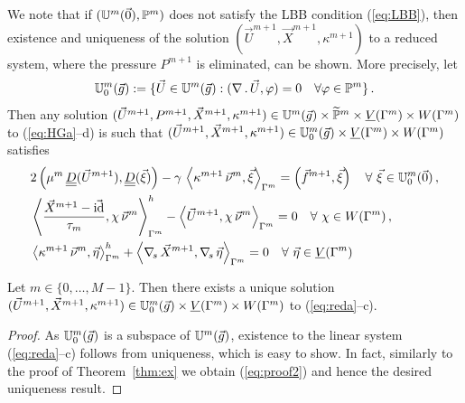 We note that if $(\uspacedisc{0}{m},\pspace^m)$ does not satisfy the LBB
condition (\ref{eq:LBB}), then existence and uniqueness of the solution
$(\vec U^{m+1},\vec X^{m+1},\kappa^{m+1})$ to a reduced system, where the
pressure $P^{m+1}$ is eliminated, can be shown. More precisely, let
\begin{equation}
\uspacesimple^m_0(\vec g) :=
\{ \vec U \in \uspacedisc{g}{m} : (\nabla\,.\,\vec U, \varphi) = 0
\quad \forall \varphi \in \pspace^m \}\,.
\end{equation}
Then any solution $(\vec U^{m+1}, P^{m+1}, \vec X^{m+1}, \kappa^{m+1})
\in \uspacedisc{g}{m}\times \pnormspace^m \times \Vh \times \Wh$
to (\ref{eq:HGa}--d) is such that $(\vec U^{m+1}, \vec X^{m+1}, \kappa^{m+1})
\in \uspacesimple^m_0(\vec g)\times \Vh \times \Wh$ satisfies
\begin{subequations}
\begin{align}
& 2\left(\mu^m\,\mat D(\vec U^{m+1}), \mat D(\vec \xi) \right)
- \gamma\,\left\langle \kappa^{m+1}\,\vec\nu^m,\vec\xi\right\rangle_{\Gamma^m}
= \left(\vec f^{m+1},\vec \xi\right) \quad \forall\ \vec\xi \in
\uspacesimple^m_0(\vec 0)\,, \label{eq:reda}\\
&  \left\langle \frac{\vec X^{m+1} - \vec\id}{\tau_m} ,\chi\,\vec\nu^m
\right\rangle_{\Gamma^m}^h - \left\langle \vec U^{m+1}, \chi\,\vec\nu^m
\right\rangle_{\Gamma^m}  = 0 \quad \forall\ \chi \in \Wh\,,
\label{eq:redb} \\
& \left\langle \kappa^{m+1}\,\vec\nu^m, \vec\eta \right\rangle_{\Gamma^m}^h
+ \left\langle \nabs\,\vec X^{m+1}, \nabs\,\vec \eta \right\rangle_{\Gamma^m} =
0 \quad \forall\ \vec\eta \in \Vh \label{eq:redc}
\end{align}
\end{subequations}

\begin{theorem} \label{thm:stabreduced}
Let $m \in \{0,\ldots,M-1\}$. Then there exists a unique solution
$(\vec U^{m+1}, \vec X^{m+1}, \kappa^{m+1}) \in \uspacesimple^m_0(\vec g)
\times \Vh \times \Wh$ to (\ref{eq:reda}--c).
\end{theorem}
\begin{proof}
As $\uspacesimple^m_0(\vec g)$ is a subspace of $\uspacedisc{g}{m}$, existence
to the linear system (\ref{eq:reda}--c) follows from uniqueness, which is easy
to show. In fact, similarly to the proof of Theorem~\ref{thm:ex} we obtain
(\ref{eq:proof2}) and hence the desired uniqueness result.
\end{proof}

